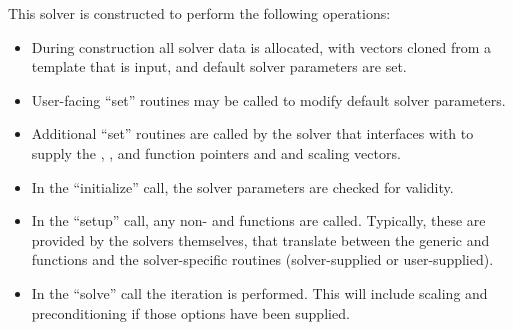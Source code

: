 This solver is constructed to perform the following operations:
\begin{itemize}
\item During construction all {\nvector} solver data is allocated,
  with vectors cloned from a template {\nvector} that is input, and
  default solver parameters are set.
\item User-facing ``set'' routines may be called to modify default
  solver parameters.
\item Additional ``set'' routines are called by the {\sundials} solver
  that interfaces with {\sunlinsolspbcgs} to supply the ,
  ,  and  function pointers and
   and  scaling vectors.
\item In the ``initialize'' call, the solver parameters are checked
  for validity.
\item In the ``setup'' call, any non-  and
   functions are called.  Typically, these are provided by
  the {\sundials} solvers themselves, that translate between the
  generic  and  functions and the
  solver-specific routines (solver-supplied or user-supplied).
\item In the ``solve'' call the {\spbcg} iteration is performed.  This
  will include scaling and preconditioning if those options have been
  supplied.
\end{itemize}


